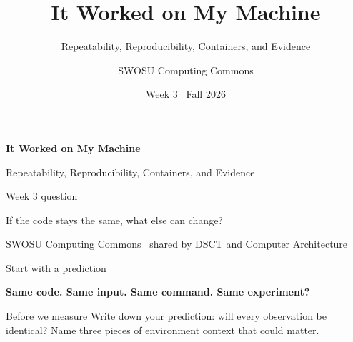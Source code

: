 \documentclass[aspectratio=169,11pt]{beamer}
\title{It Worked on My Machine}
\subtitle{Repeatability, Reproducibility, Containers, and Evidence}
\author{SWOSU Computing Commons}
\date{Week 3 \textbullet\ Fall 2026}
\newcommand{\bigquestion}[1]{%
  \begin{center}
  \vspace{0.15em}
  {\Large\bfseries\color{DeepNavy}#1}
  \end{center}
}
\begin{document}
{
\begin{frame}[plain]
  \vspace{1.0cm}
  {\Huge\bfseries\color{white}It Worked on My Machine\par}
  \vspace{0.35cm}
  {\Large\color{SoftBlue}Repeatability, Reproducibility, Containers, and Evidence\par}
  \vfill
  {\large\color{WarmGold}Week 3 question}\par
  \vspace{0.15cm}
  {\Large\color{white}If the code stays the same, what else can change?\par}
  \vfill
  {\small\color{SoftBlue}SWOSU Computing Commons \textbullet\ shared by DSCT and Computer Architecture}
\end{frame}}

\begin{frame}{Start with a prediction}
\bigquestion{Same code. Same input. Same command. Same experiment?}

\begin{center}
\end{center}

\begin{alertblock}{Before we measure}
Write down your prediction: will every observation be identical? Name three pieces of environment context that could matter.
\end{alertblock}
\end{frame}
\end{document}
